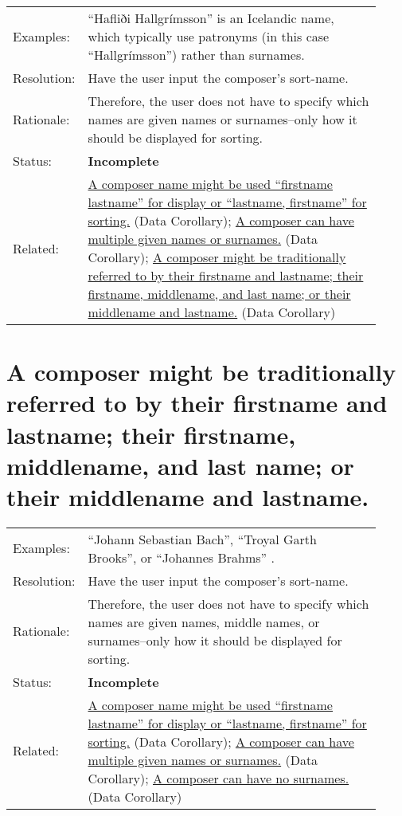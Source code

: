 \documentclass[letterpaper]{report}
\begin{document}
\begin{tabular}{ p{0.1\linewidth} p{0.825\linewidth} }
  Examples: & ``Hafliði Hallgrímsson'' is an Icelandic name, which typically use patronyms (in this case ``Hallgrímsson'') rather than surnames.  \\ 
  Resolution: & Have the user input the composer's sort-name. \\
  Rationale: & Therefore, the user does not have to specify which names are given names or surnames--only how it should be displayed for sorting. \\
  Status: & \textbf{Incomplete}\\
  Related: & \hyperref[D.8]{A composer name might be used ``firstname lastname'' for display or ``lastname, firstname'' for sorting.} (Data Corollary); \hyperref[D.9]{A composer can have multiple given names or surnames.} (Data Corollary); \hyperref[D.11]{A composer might be traditionally referred to by their firstname and lastname; their firstname, middlename, and last name; or their middlename and lastname.} (Data Corollary) \\
\end{tabular}

\section{A composer might be traditionally referred to by their firstname and lastname; their firstname, middlename, and last name; or their middlename and lastname. }
\label{D.11}

\begin{tabular}{ p{0.1\linewidth} p{0.825\linewidth} }
  Examples: & ``Johann Sebastian Bach'', ``Troyal Garth Brooks'', or ``Johannes Brahms'' . \\ 
  Resolution: & Have the user input the composer's sort-name. \\
  Rationale: & Therefore, the user does not have to specify which names are given names, middle names, or surnames--only how it should be displayed for sorting. \\
  Status: & \textbf{Incomplete} \\
  Related: & \hyperref[D.8]{A composer name might be used ``firstname lastname'' for display or ``lastname, firstname'' for sorting.} (Data Corollary); \hyperref[D.9]{A composer can have multiple given names or surnames.} (Data Corollary); \hyperref[D.10]{A composer can have no surnames.} (Data Corollary) \\
\end{tabular}
\end{document}
